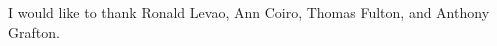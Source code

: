 \noindent
I would like to thank Ronald Levao, Ann Coiro, Thomas Fulton, and Anthony Grafton.
\newpage
